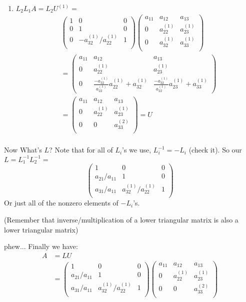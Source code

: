 \begin{enumerate}
\item $ L_2L_1A=L_2U^{(1)}=$  \begin{align*}
    &\begin{pmatrix}
  1 &  0&0\\
  0 & 1 & 0 \\
0&  -a_{32}^{(1)}/a_{22}^{(1)}& 1 \\
  \end{pmatrix}\begin{pmatrix}
  a_{11}&  a_{12}&  a_{13}\\
0& a_{22}^{(1)}&   a_{23}^{(1)}\\ 
0&  a_{32}^{(1)}&  a_{33}^{(1)}\\
\end{pmatrix}\\
&=\begin{pmatrix}
  a_{11}&  a_{12}&  a_{13}\\
0& a_{22}^{(1)}& a_{23}^{(1)}\\ 
0 & \frac{-a_{32}^{(1)}}{a_{22}^{(1)}}a_{22}^{(1)}+a_{32}^{(1)}& \frac{-a_{32}^{(1)}}{a_{22}^{(1)}}a_{23}^{(1)}+a_{33}^{(1)}
\end{pmatrix}\\
&=\begin{pmatrix}
  a_{11}&  a_{12}&  a_{13}\\
0& a_{22}^{(1)}& a_{23}^{(1)}\\ 
0&  0&  a_{33}^{(2)}\\
\end{pmatrix} = U\\
  \end{align*}
\end{enumerate}

Now What's $L$? Note that for all of $L_i$'s we use, $L_i^{-1} = -L_i$ (check it). So our 
$L=L_1^{-1}L_2^{-1} =$
$$\begin{pmatrix}
  1&0&0\\
  a_{21}/a_{11}& 1 & 0\\
a_{31}/a_{11}& a_{32}^{(1)}/a_{22}^{(1)}& 1 \\
\end{pmatrix}
$$ Or just all of the nonzero elements of $-L_i$'s.

(Remember that inverse/multiplication of a lower triangular matrix is also a lower
triangular matrix)

\noi
phew... Finally we have:
\begin{align*}
A &= LU  \\
&=\begin{pmatrix}
  1&0&0\\
  a_{21}/a_{11}& 1 & 0\\
a_{31}/a_{11}& a_{32}^{(1)}/a_{22}^{(1)}& 1 \\
\end{pmatrix}\begin{pmatrix}
  a_{11}&  a_{12}&  a_{13}\\
0& a_{22}^{(1)}& a_{23}^{(1)}\\ 
0&  0&  a_{33}^{(2)}\\
\end{pmatrix}
\end{align*}

